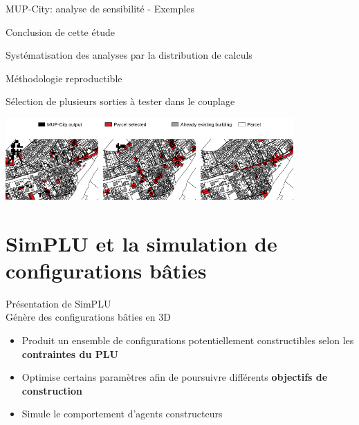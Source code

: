 \documentclass[xcolor=table]{beamer}
\begin{document}
\begin{frame}{MUP-City: analyse de sensibilité - Exemples}

\end{frame}

\begin{frame}{Conclusion de cette étude}
	\begin{description}
		\item Systématisation des analyses par la distribution de calculs
		\item Méthodologie reproductible
		\item Sélection de plusieurs sorties à tester dans le couplage\\
	\end{description}
	\begin{block}{}\centering\includegraphics[width=11cm]{Images/exMup.png}\end{block}	
\end{frame}

\section[SimPLU]{SimPLU et la simulation de configurations bâties}

\begin{frame}{Présentation de SimPLU}
	\\
	Génère des configurations bâties en 3D
	\begin{itemize}
		\item Produit un ensemble de configurations potentiellement constructibles selon les \textbf{contraintes du PLU}
		\item Optimise certains paramètres afin de poursuivre différents \textbf{objectifs de construction}
		\item Simule le comportement d'agents constructeurs
	\end{itemize} 
\end{frame}
\end{document}
